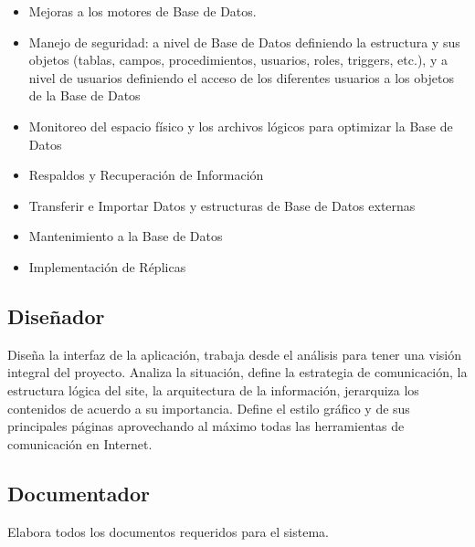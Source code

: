 		\begin{itemize}
			\item Mejoras a los motores de Base de Datos.
							
			\item Manejo de seguridad: a nivel de Base de Datos definiendo la estructura y
			sus objetos (tablas, campos, procedimientos, usuarios, roles, triggers, etc.), y
			a nivel de usuarios definiendo el acceso de los diferentes usuarios a los
			objetos de la Base de Datos
			
			\item Monitoreo del espacio físico y los archivos lógicos para optimizar la Base
			de Datos
			
			\item Respaldos y Recuperación de Información
			\item Transferir e Importar Datos y estructuras de Base de Datos externas
			\item Mantenimiento a la Base de Datos
			\item Implementación de Réplicas
		\end{itemize}
		
	\subsection{Diseñador}
		Diseña la interfaz de la aplicación, trabaja desde el análisis para tener una
		visión integral del proyecto. Analiza la situación, define la estrategia de 	
		comunicación, la estructura lógica del site, la arquitectura de la
		información, jerarquiza los contenidos de acuerdo a su importancia. Define el
		estilo gráfico y de sus principales páginas aprovechando al máximo todas las
		herramientas de comunicación en Internet.
		
	\subsection{Documentador}
		Elabora todos los documentos requeridos para el sistema.